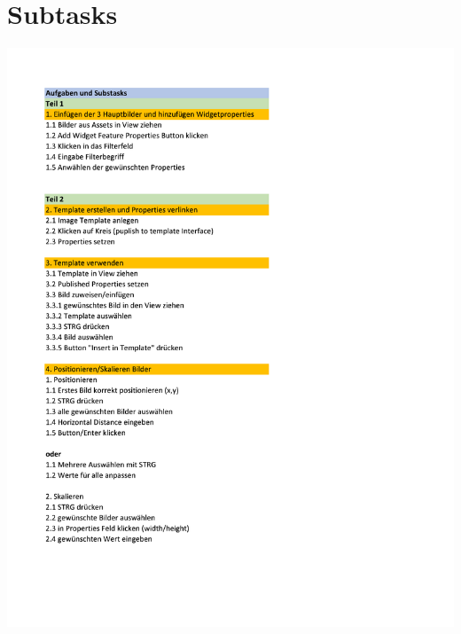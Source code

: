 \chapter{Subtasks}\label{app:Subtasks}
\begin{center}
  \includegraphics[scale=0.9]{supplement/Subtasks_01.pdf}
\end{center}

